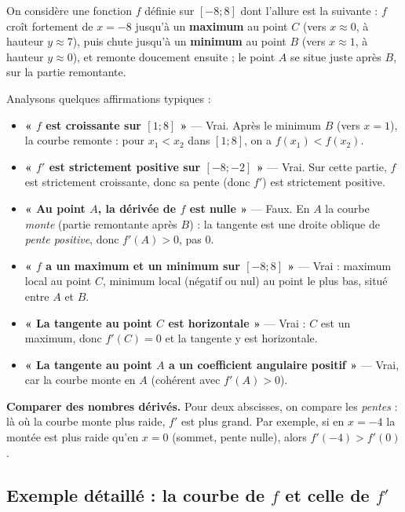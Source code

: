 \documentclass[11pt,a4paper]{article}
\begin{document}
\begin{exemple}
On considère une fonction $f$ définie sur $[-8;8]$ dont l'allure est la suivante : $f$ croît
fortement de $x=-8$ jusqu'à un \textbf{maximum} au point $C$ (vers $x\approx 0$, à hauteur $y\approx 7$),
puis chute jusqu'à un \textbf{minimum} au point $B$ (vers $x\approx 1$, à hauteur $y\approx 0$), et
remonte doucement ensuite ; le point $A$ se situe juste après $B$, sur la partie remontante.

\medskip
Analysons quelques affirmations typiques :
\begin{itemize}[leftmargin=1.6em,topsep=3pt,itemsep=4pt]
  \item \textbf{« $f$ est croissante sur $[1;8]$ »} — \textcolor{thmcol}{Vrai}. Après le minimum $B$
        (vers $x=1$), la courbe remonte : pour $x_1<x_2$ dans $[1;8]$, on a $f(x_1)<f(x_2)$.
  \item \textbf{« $f'$ est strictement positive sur $[-8;-2]$ »} — \textcolor{thmcol}{Vrai}. Sur cette
        partie, $f$ est strictement croissante, donc sa pente (donc $f'$) est strictement positive.
  \item \textbf{« Au point $A$, la dérivée de $f$ est nulle »} — \textcolor{attncol}{Faux}. En $A$ la
        courbe \emph{monte} (partie remontante après $B$) : la tangente est une droite oblique de
        \emph{pente positive}, donc $f'(A)>0$, pas $0$.
  \item \textbf{« $f$ a un maximum et un minimum sur $[-8;8]$ »} — \textcolor{thmcol}{Vrai} : maximum
        local au point $C$, minimum local (négatif ou nul) au point le plus bas, situé entre $A$ et $B$.
  \item \textbf{« La tangente au point $C$ est horizontale »} — \textcolor{thmcol}{Vrai} : $C$ est un
        maximum, donc $f'(C)=0$ et la tangente y est horizontale.
  \item \textbf{« La tangente au point $A$ a un coefficient angulaire positif »} —
        \textcolor{thmcol}{Vrai}, car la courbe monte en $A$ (cohérent avec $f'(A)>0$).
\end{itemize}
\textbf{Comparer des nombres dérivés.} Pour deux abscisses, on compare les \emph{pentes} : là où la
courbe monte plus raide, $f'$ est plus grand. Par exemple, si en $x=-4$ la montée est plus raide qu'en
$x=0$ (sommet, pente nulle), alors $f'(-4)>f'(0)$.
\end{exemple}

\subsection{Exemple détaillé : la courbe de \texorpdfstring{$f$}{f} et celle de \texorpdfstring{$f'$}{f'}}
\end{document}
